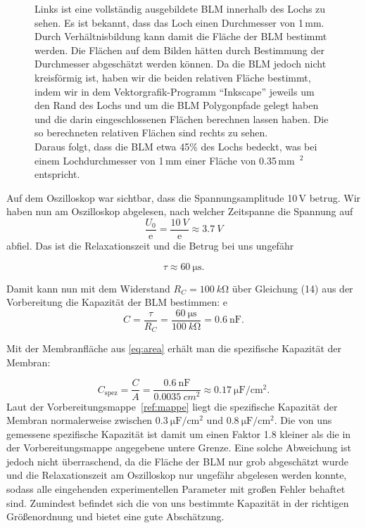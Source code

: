 \documentclass[a4paper,ngerman]{scrartcl}
\begin{document}
\begin{figure}[tbh!]
\begin{minipage}[b]{.4\textwidth}
  \end{minipage}
  \caption{Links ist eine vollständig ausgebildete BLM innerhalb des Lochs zu sehen.
Es ist bekannt, dass das Loch einen Durchmesser von 1\,mm. Durch Verhältnisbildung kann damit die Fläche 
der BLM bestimmt werden. Die Flächen auf dem Bilden hätten durch Bestimmung der Durchmesser abgeschätzt werden können. Da die BLM jedoch
nicht kreisförmig ist, haben wir die beiden relativen Fläche bestimmt, indem wir in dem Vektorgrafik-Programm "`Inkscape"'
jeweils um den Rand des Lochs und um die BLM Polygonpfade gelegt haben und die darin eingeschlossenen Flächen berechnen lassen haben. Die so 
berechneten relativen Flächen sind rechts zu sehen.\\
Daraus folgt, dass die BLM etwa 45\% des Lochs bedeckt, was bei einem Lochdurchmesser von 1\,mm einer Fläche von 0.35\,mm~$^2$ entspricht.}
\label{fig:blmflaeche}
\end{figure}

Auf dem Oszilloskop war sichtbar, dass die Spannungsamplitude 10\,V betrug. Wir haben nun am Oszilloskop abgelesen, nach welcher Zeitspanne die Spannung auf
\begin{equation}
 \frac{U_0}{\mathrm{e}} = \frac{\SI{10}{V}}{\mathrm{e}} \approx \SI{3,7}{V} 
\end{equation}
abfiel. Das ist die Relaxationszeit und die Betrug bei uns ungefähr

\begin{equation}
  \label{eqn:tau_einkanal}
  \tau \approx \SI{60}{\micro\s}.
\end{equation}

Damit kann nun  mit dem Widerstand $R_C = \SI{100}{k\ohm}$
über Gleichung (14) aus der Vorbereitung die Kapazität der BLM bestimmen:
e\begin{equation}
 C = \frac{\tau}{R_C} = \frac{\SI{60}{\micro\s}}{\SI{100}{k\ohm}} = \SI{0,6}{\nano\farad}.
\end{equation}

Mit der Membranfläche aus \eqref{eq:area} erhält man die spezifische Kapazität der Membran:

\begin{equation}
  C_{\text{spez}} = \frac{C}{A} = \frac{\SI{0,6}{\nano\farad}}{\SI{0,0035}{cm^2}} \approx \SI{0,17}{\micro\farad\per\cm^2}.
\end{equation}
Laut der Vorbereitungsmappe~\ref{ref:mappe} liegt die spezifische Kapazität der Membran normalerweise zwischen $\SI{0,3}{\micro\F\per\cm^2}$
und $\SI{0,8}{\micro\F\per\cm^2}$. Die von uns gemessene spezifische Kapazität ist damit um einen Faktor 1.8 kleiner als die 
in der Vorbereitungsmappe angegebene untere Grenze. Eine solche Abweichung ist jedoch nicht überraschend, da 
die Fläche der BLM nur grob abgeschätzt wurde und die Relaxationszeit 
am Oszilloskop nur ungefähr abgelesen werden konnte, sodass alle eingehenden experimentellen Parameter mit großen Fehler behaftet sind.
Zumindest befindet sich die von uns bestimmte Kapazität in der richtigen Größenordnung und bietet eine gute Abschätzung. \\
\end{document}
